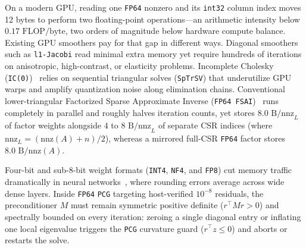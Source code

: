 \documentclass[10pt]{article}
\begin{document}
On a modern GPU, reading one \texttt{FP64} nonzero and its \texttt{int32} column index moves 12 bytes to perform two floating-point operations---an arithmetic intensity below $0.17\text{ FLOP/byte}$, two orders of magnitude below hardware compute balance. Existing GPU smoothers pay for that gap in different ways. Diagonal smoothers such as \texttt{l1-Jacobi} read minimal extra memory yet require hundreds of iterations on anisotropic, high-contrast, or elasticity problems. Incomplete Cholesky (\texttt{IC(0)})~\cite{meijerink1977ic,vacek2025mixed} relies on sequential triangular solves (\texttt{SpTrSV}) that underutilize GPU warps and amplify quantization noise along elimination chains. Conventional lower-triangular Factorized Sparse Approximate Inverse (\texttt{FP64 FSAI})~\cite{kolotilina1993fsai,janna2015fsaipack} runs completely in parallel and roughly halves iteration counts, yet stores $8.0\text{ B/nnz}_L$ of factor weights alongside $4$ to $8\text{ B/nnz}_L$ of separate CSR indices (where $\mathrm{nnz}_L = (\mathrm{nnz}(A) + n)/2$), whereas a mirrored full-CSR \texttt{FP64} factor stores $8.0\text{ B/nnz}(A)$.

Four-bit and sub-8-bit weight formats (\texttt{INT4}, \texttt{NF4}, and \texttt{FP8}) cut memory traffic dramatically in neural networks~\cite{dettmers2022llmint8,micikevicius2022fp8,frantar2023gptq,dettmers2023qlora}, where rounding errors average across wide dense layers. Inside \texttt{FP64} \texttt{PCG} targeting host-verified $10^{-8}$ residuals, the preconditioner $M$ must remain symmetric positive definite ($r^\top M r > 0$) and spectrally bounded on every iteration: zeroing a single diagonal entry or inflating one local eigenvalue triggers the \texttt{PCG} curvature guard ($r^\top z \le 0$) and aborts or restarts the solve.
\end{document}
